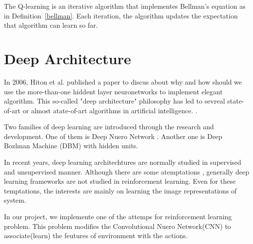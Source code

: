 \documentclass{article}
\begin{document}
The Q-learning is an iterative algorithm that implementes Bellman's equation as in Definition~\ref{bellman}\citep{watkins1989learning}. Each iteration, the algorithm updates the expectation that algorithm can learn so far. 

\section{Deep Architecture}
In 2006, Hiton et al. published a paper \cite{hinton2006fast} to discus about why and how should we use the more-than-one hiddent layer neuronetworks to implement elegant algorithm. This so-called "deep architecture" philosophy has led to sevreal state-of-art or almost atate-of-art algorithms in artificial intelligence.  \cite{lecun1998gradient} \cite{hinton2012deep}. 

Two families of deep learning are introduced through the research and development. One of them is Deep Nuero Network \cite{fukushima1980neocognitron}\cite{lecun1998gradient}. Another one is Deep Bozlman Machine (DBM)\cite{hinton1986learning} with hidden units.

In recent years, deep learning architechtures are normally studied in supervised and unsupervised manner. Although there are some atemptations \citep{mnih2013playing}\citep{lenz2013deep}, generally deep learning frameworks are not studied in reinforcement learning. Even for these temptations, the interests are mainly on learning the image representations of system.

In our project, we implemente one of the attemps for reinforcement learning problem. This problem modifies the Convolutional Nuero Network(CNN)\cite{lecun1998gradient} to associate(learn) the feutures of environment with the actions.
\end{document}
